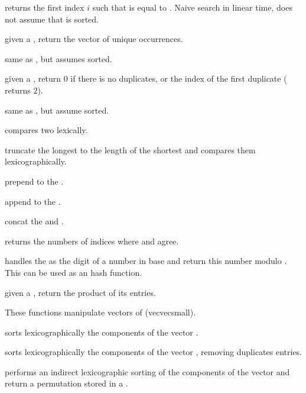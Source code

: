  returns the first index $i$
such that  is equal to . Naive search in linear time, does
not assume that  is sorted.

 given a  , return
the vector of unique occurrences.

 same as , but assumes
  sorted.

 given a  , return
$0$ if there is no duplicates, or the index of the first duplicate
( returns $2$).

 same as
, but assume  sorted.

 compares two  lexically.

 truncate the longest 
to the length of the shortest and compares them lexicographically.

 prepend  to the
 .

 append  to the
 .

 concat the  
and .

 returns the numbers of indices
where  and  agree.

 handles the
  as the digit of a number in base  and return
this number modulo . This can be used as an hash function.

 given a  , return
the product of its entries.

These functions manipulate vectors of  (vecvecsmall).

 sorts lexicographically the components of
the vector .

 sorts lexicographically the components of
the vector , removing duplicates entries.

 performs an indirect lexicographic
sorting of the components of the vector  and return a permutation
stored in a .

